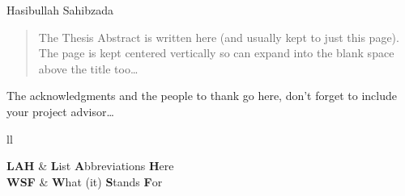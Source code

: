 \documentclass[
11pt, %
oneside, %
english, %
, %
headsepline, %
]{MastersDoctoralThesis} %
\begin{document}
\hfill Hasibullah Sahibzada


\begin{abstract}
\addchaptertocentry{\abstractname} %

The Thesis Abstract is written here (and usually kept to just this page). The page is kept centered vertically so can expand into the blank space above the title too\ldots

\end{abstract}


\begin{acknowledgements}
\addchaptertocentry{\acknowledgementname} %

The acknowledgments and the people to thank go here, don't forget to include your project advisor\ldots

\end{acknowledgements}

\setcounter{tocdepth}{2}
\tableofcontents %

\listoffigures %

\listoftables %


\begin{abbreviations}{ll} %

\textbf{LAH} & \textbf{L}ist \textbf{A}bbreviations \textbf{H}ere\\
\textbf{WSF} & \textbf{W}hat (it) \textbf{S}tands \textbf{F}or\\

\end{abbreviations}
\end{document}

